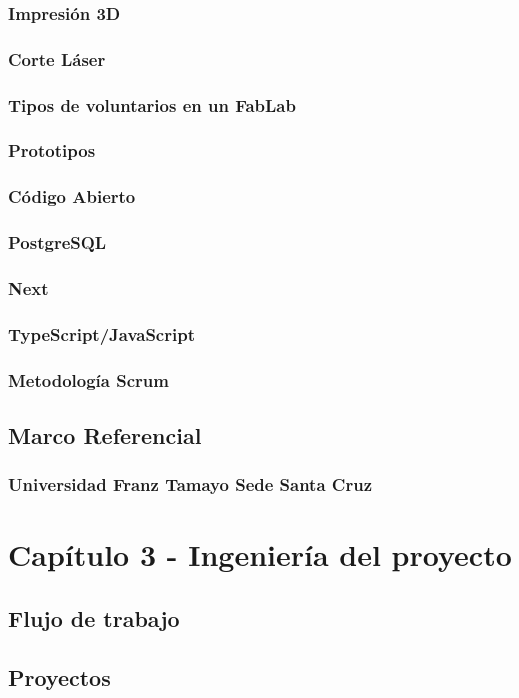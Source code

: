 \documentclass{article}
\begin{document}
\subsubsection{Impresión 3D}
\subsubsection{Corte Láser}
\subsubsection{Tipos de voluntarios en un FabLab}
\subsubsection{Prototipos}
\subsubsection{Código Abierto}
\subsubsection{PostgreSQL}
\subsubsection{Next}
\subsubsection{TypeScript/JavaScript}
\subsubsection{Metodología Scrum}
\subsection{Marco Referencial}
\subsubsection{Universidad Franz Tamayo Sede Santa Cruz}

\section{Capítulo 3 - Ingeniería del proyecto}
\subsection{Flujo de trabajo}
\subsection{Proyectos}
\end{document}
